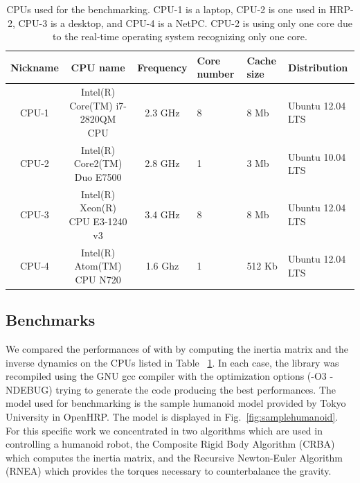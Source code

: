 \begin{table}
  \begin{center}
  \begin{tabular}{|c|c|c|l|l|l|} \hline
    Nickname &                         CPU name & Frequency &  Core number & Cache size & Distribution \\ \hline \hline
    CPU-1    & Intel(R) Core(TM) i7-2820QM CPU  & 2.3 GHz   & 8            & 8 Mb       & Ubuntu 12.04 LTS \\
    CPU-2    & Intel(R) Core2(TM) Duo E7500     & 2.8 GHz   & 1            & 3 Mb       & Ubuntu 10.04 LTS \\
    CPU-3    & Intel(R) Xeon(R) CPU E3-1240 v3  & 3.4 GHz   & 8            & 8 Mb       & Ubuntu 12.04 LTS \\
    CPU-4    & Intel(R) Atom(TM) CPU N720       & 1.6 Ghz   & 1            & 512 Kb     & Ubuntu 12.04 LTS \\ \hline 
  \end{tabular}
  \caption{CPUs used for the benchmarking. CPU-1 is a laptop, CPU-2 is one used in HRP-2, CPU-3 is a desktop, and CPU-4 is a NetPC.
CPU-2 is using only one core due to the real-time operating system recognizing only one core.}
  \label{table:CPUs}
  \end{center}
\end{table}

\subsection{Benchmarks}
We compared the performances of \softmetapod with \softrbdl by computing the inertia matrix and the inverse dynamics on the CPUs
listed in Table ~\ref{table:CPUs}.
In each case, the library was recompiled using the GNU gcc compiler with the optimization options (-O3 -NDEBUG) 
trying to generate the code producing the best performances. The model used for benchmarking is the sample humanoid model
provided by Tokyo University in OpenHRP. The model is displayed in Fig.~\ref{fig:samplehumanoid}.
For this specific work we concentrated in two algorithms which are used in controlling a humanoid robot,
the Composite Rigid Body Algorithm (CRBA) which computes the inertia matrix, and the Recursive Newton-Euler Algorithm (RNEA)
which provides the torques necessary to counterbalance the gravity. 

